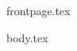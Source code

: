 \documentclass[11pt]{llncs}
\begin{document}
{frontpage.tex}

{body.tex}

\iflncs
\thispagestyle{plain}
\fi

\ifccs
  
\else
  
\fi

\end{document}
